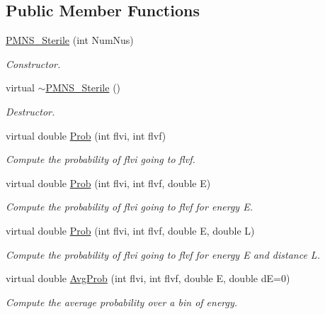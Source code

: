 \subsection*{Public Member Functions}
\begin{DoxyCompactItemize}
\item 
\hyperlink{classOscProb_1_1PMNS__Sterile_a774766ab4278d9369a295ffa8e2d272c}{P\+M\+N\+S\+\_\+\+Sterile} (int Num\+Nus)
\begin{DoxyCompactList}\small\item\em Constructor. \end{DoxyCompactList}\item 
virtual \hyperlink{classOscProb_1_1PMNS__Sterile_a992eaf747da2c16f680060d48284c2b9}{$\sim$\+P\+M\+N\+S\+\_\+\+Sterile} ()
\begin{DoxyCompactList}\small\item\em Destructor. \end{DoxyCompactList}\item 
virtual double \hyperlink{classOscProb_1_1PMNS__Base_aec5c399b93261f1962a4b7dbbb44b973}{Prob} (int flvi, int flvf)
\begin{DoxyCompactList}\small\item\em Compute the probability of flvi going to flvf. \end{DoxyCompactList}\item 
virtual double \hyperlink{classOscProb_1_1PMNS__Base_aa3cee10639d5c0879ccb9e78d62128d3}{Prob} (int flvi, int flvf, double E)
\begin{DoxyCompactList}\small\item\em Compute the probability of flvi going to flvf for energy E. \end{DoxyCompactList}\item 
virtual double \hyperlink{classOscProb_1_1PMNS__Base_a6e0a74508d9d6db7be02e242b8467563}{Prob} (int flvi, int flvf, double E, double L)
\begin{DoxyCompactList}\small\item\em Compute the probability of flvi going to flvf for energy E and distance L. \end{DoxyCompactList}\item 
virtual double \hyperlink{classOscProb_1_1PMNS__Base_ac03f754160422e6600da8dbae0f803ed}{Avg\+Prob} (int flvi, int flvf, double E, double dE=0)
\begin{DoxyCompactList}\small\item\em Compute the average probability over a bin of energy. \end{DoxyCompactList}\item 

\end{DoxyCompactItemize}
